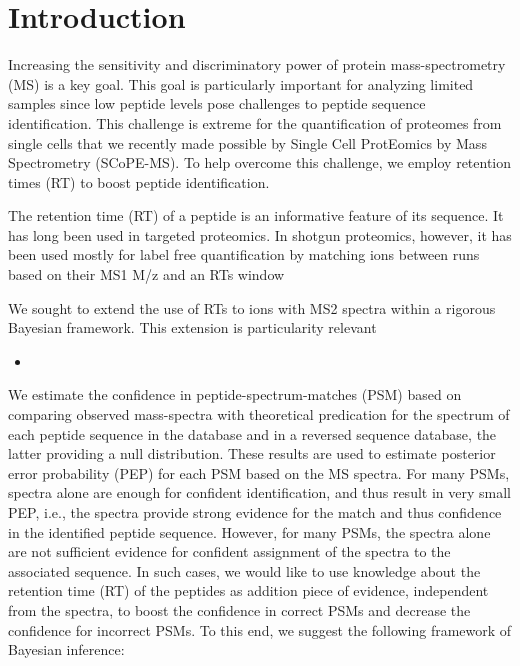 
%
%

\date{}






\section{Introduction}
Increasing the sensitivity and discriminatory power of protein mass-spectrometry (MS) is a key goal. This goal is particularly important for analyzing limited samples since low peptide levels pose challenges to peptide sequence identification. This challenge is extreme for the quantification of proteomes from single cells that we recently made possible by Single Cell ProtEomics by Mass Spectrometry (SCoPE-MS). To help overcome this challenge, we employ retention times (RT) to boost peptide identification.     


The retention time (RT) of a peptide is an informative feature of its sequence. It has long been used in targeted proteomics.  In shotgun proteomics, however, it has been used mostly for label free quantification by matching ions between runs based on their MS1 M/z and an RTs window %

We sought to extend the use of RTs to ions with MS2 spectra within a rigorous Bayesian framework. This extension is particularity relevant    
 
 
\begin{itemize}
\item 
\end{itemize}



We estimate the confidence in peptide-spectrum-matches (PSM) based on comparing observed mass-spectra with theoretical predication for the spectrum of each peptide sequence in the database and in a reversed sequence database, the latter providing a null distribution. These results are used to estimate posterior error probability (PEP) for each PSM based on the MS spectra. For many PSMs, spectra alone are enough for confident identification, and thus result in very small PEP, i.e., the spectra provide strong evidence for the match and thus confidence in the identified peptide sequence. However, for many PSMs, the spectra alone are not sufficient evidence for confident assignment of the spectra to the associated sequence. In such cases, we would like to use knowledge about the retention time (RT) of the peptides as addition piece of evidence, independent from the spectra, to boost the confidence in correct PSMs and decrease the confidence for incorrect PSMs. To this end, we suggest the following framework of Bayesian inference:


